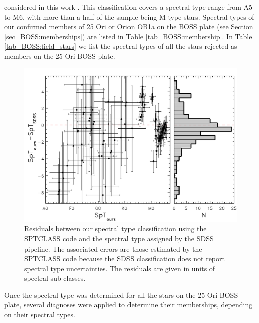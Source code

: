 \documentclass[12pt]{article}
\newcounter{subsubsubsection}[subsubsection]
\begin{document}
considered in this work \citep[e.g.][]{Briceno2007, Hernandez2007b, Downes2014}. This classification covers a spectral type range from A5 to M6, with more than a half of the sample being M-type stars. Spectral types of our confirmed members of 25 Ori or Orion OB1a on the BOSS plate (see Section \ref{sec_BOSS:memberships}) are listed in Table \ref{tab_BOSS:membership}. In Table \ref{tab_BOSS:field_stars} we list the spectral types of all the stars rejected as members on the 25 Ori BOSS plate.

\begin{figure}
	\begin{minipage}{0.60\textwidth}
		\includegraphics[width=1\textwidth]{f4.pdf}
	\end{minipage} \hfill
	\begin{minipage}{0.35\textwidth}
		\caption[SpT residuals between our classification and that from SDSS]{Residuals between our spectral type classification using the SPTCLASS code \citep{Hernandez2004} and the spectral type assigned by the SDSS pipeline. The associated errors are those estimated by the SPTCLASS code because the SDSS classification does not report spectral type uncertainties. The residuals are given in units of spectral sub-classes.}
		\label{fig_BOSS:sptclass}
	\end{minipage}
\end{figure}

\label{sec_BOSS:memberships}

Once the spectral type was determined for all the stars on the 25 Ori BOSS plate, several diagnoses were applied to determine their memberships, depending on their spectral types.
\end{document}
